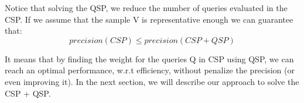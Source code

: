 Notice that solving the QSP, we reduce the number of queries evaluated in the CSP. If we assume that the sample V is representative enough we can guarantee that: 
\[
  precision(CSP) \leq precision(CSP+QSP)
\]

It means that by finding the weight for the queries Q in CSP using QSP, we can reach an optimal performance, w.r.t efficiency, without penalize the precision (or even improving it).
In the next section, we will describe our approach to solve the CSP + QSP.
 
 


